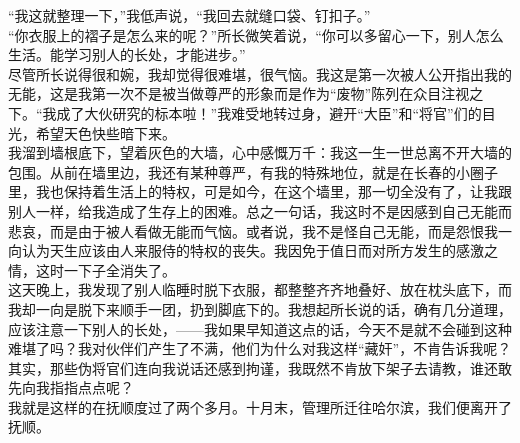 “我这就整理一下，”我低声说，“我回去就缝口袋、钉扣子。”\\

“你衣服上的褶子是怎么来的呢？”所长微笑着说，“你可以多留心一下，别人怎么生活。能学习别人的长处，才能进步。”\\

尽管所长说得很和婉，我却觉得很难堪，很气恼。我这是第一次被人公开指出我的无能，这是我第一次不是被当做尊严的形象而是作为“废物”陈列在众目注视之下。“我成了大伙研究的标本啦！”我难受地转过身，避开“大臣”和“将官”们的目光，希望天色快些暗下来。\\

我溜到墙根底下，望着灰色的大墙，心中感慨万千：我这一生一世总离不开大墙的包围。从前在墙里边，我还有某种尊严，有我的特殊地位，就是在长春的小圈子里，我也保持着生活上的特权，可是如今，在这个墙里，那一切全没有了，让我跟别人一样，给我造成了生存上的困难。总之一句话，我这时不是因感到自己无能而悲哀，而是由于被人看做无能而气恼。或者说，我不是怪自己无能，而是怨恨我一向认为天生应该由人来服侍的特权的丧失。我因免于值日而对所方发生的感激之情，这时一下子全消失了。\\

这天晚上，我发现了别人临睡时脱下衣服，都整整齐齐地叠好、放在枕头底下，而我却一向是脱下来顺手一团，扔到脚底下的。我想起所长说的话，确有几分道理，应该注意一下别人的长处，——我如果早知道这点的话，今天不是就不会碰到这种难堪了吗？我对伙伴们产生了不满，他们为什么对我这样“藏奸”，不肯告诉我呢？\\

其实，那些伪将官们连向我说话还感到拘谨，我既然不肯放下架子去请教，谁还敢先向我指指点点呢？\\

我就是这样的在抚顺度过了两个多月。十月末，管理所迁往哈尔滨，我们便离开了抚顺。\\